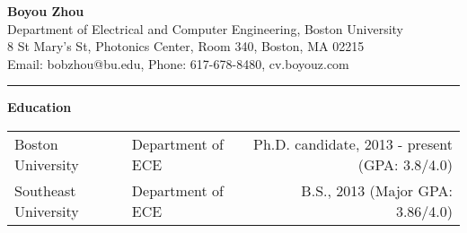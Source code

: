\documentclass[]{article}
\begin{document}
\pagestyle{empty}
\begin{center}
{\large\textbf{Boyou Zhou}}\\
Department of Electrical and Computer Engineering, Boston University\\
8 St Mary's St, Photonics Center, Room 340, Boston, MA 02215\\
Email: bobzhou@bu.edu, Phone: 617-678-8480, cv.boyouz.com\\
\rule[-0.1cm]{7.5in}{0.01cm}
\end{center}
%

\textbf{Education}
\begin{table*}[h]
  \begin{tabular}{p{2.0in}p{2.0in}r}
    Boston University& Department of ECE & Ph.D. candidate, 2013 - present
    (GPA: 3.8/4.0)\\ 
    Southeast University & Department of ECE & B.S., 2013
    (Major GPA: 3.86/4.0)\\ 
  \end{tabular}
  \label{tbl:1}
\end{table*}
\end{document}
